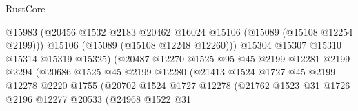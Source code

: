 \begin{lexlean}{RustCore}
\begin{coremodule}
                                          @15983
                                          (@20456
                                            @1532
                                            @2183
                                            @20462
                                            @16024
                                            @15106
                                            (@15089 (@15108 @12254 @2199)))
                                          @15106
                                          (@15089 (@15108 @12248 @12260)))
                                        @15304
                                        @15307
                                        @15310
                                        @15314
                                        @15319
                                        @15325)
                                      (@20487
                                        @12270
                                        @1525
                                        @95
                                        @45
                                        @2199
                                        @12281
                                        @2199
                                        @2294
                                        (@20686
                                          @1525
                                          @45
                                          @2199
                                          @12280
                                          (@21413
                                            @1524
                                            @1727
                                            @45
                                            @2199
                                            @12278
                                            @2220
                                            @1755
                                            (@20702
                                              @1524
                                              @1727
                                              @12278
                                              (@21762
                                                @1523
                                                @31
                                                @1726
                                                @2196
                                                @12277
                                                @20533
                                                (@24968
                                                  @1522
                                                  @31

\end{coremodule}
\end{lexlean}
